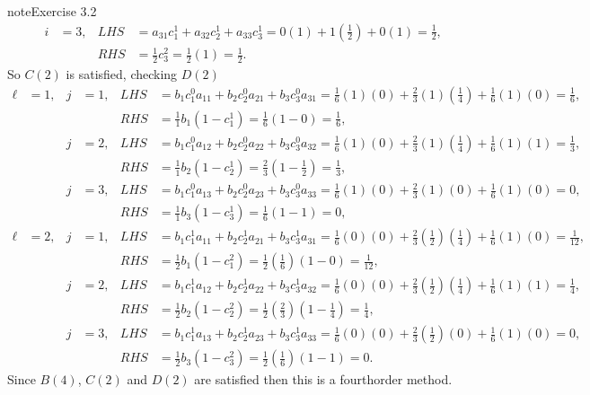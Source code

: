 \documentclass[letterpaper,10pt,english]{jupyterBook}
\begin{document}
\begin{sphinxadmonition}{note}{Exercise 3.2}
\begin{align*}
    && i &= 3, & LHS &= a_{31} c_1^1 + a_{32} c_2^1 + a_{33} c_3^1 = 0(1) + 1(\tfrac{1}{2}) + 0(1) = \tfrac{1}{2}, \\
    &&&& RHS &= \tfrac{1}{2} c_3^2 = \tfrac{1}{2}(1) = \tfrac{1}{2}.
\end{align*}
\sphinxAtStartPar
So \(C(2)\) is satisfied, checking \(D(2)\)
\begin{align*}
    \ell &= 1, & j &= 1, & LHS &= b_1 c_1^0 a_{11} + b_2 c_2^0 a_{21} + b_3 c_3^0 a_{31} 
    = \tfrac{1}{6}(1)(0) + \tfrac{2}{3}(1)(\tfrac{1}{4}) + \tfrac{1}{6}(1)(0) = \tfrac{1}{6}, \\
    &&&& RHS &= \tfrac{1}{1} b_1 (1 - c_1^1) = \tfrac{1}{6} (1 - 0) = \tfrac{1}{6}, \\
    && j &= 2, & LHS &= b_1 c_1^0 a_{12} + b_2 c_2^0 a_{22} + b_3 c_3^0 a_{32} 
    = \tfrac{1}{6}(1)(0) + \tfrac{2}{3}(1)(\tfrac{1}{4}) + \tfrac{1}{6}(1)(1) = \tfrac{1}{3}, \\
    &&&& RHS &= \tfrac{1}{1} b_2 (1 - c_2^1) = \tfrac{2}{3} (1 - \tfrac{1}{2}) = \tfrac{1}{3}, \\
    && j &= 3, & LHS &= b_1 c_1^0 a_{13} + b_2 c_2^0 a_{23} + b_3 c_3^0 a_{33} 
    = \tfrac{1}{6}(1)(0) + \tfrac{2}{3}(1)(0) + \tfrac{1}{6}(1)(0) = 0, \\
    &&&& RHS &= \tfrac{1}{1} b_3 (1 - c_3^1) = \tfrac{1}{6} (1 - 1) = 0, \\
    \ell &= 2, & j &= 1, & LHS &= b_1 c_1^1 a_{11} + b_2 c_2^1 a_{21} + b_3 c_3^1 a_{31} 
    = \tfrac{1}{6}(0)(0) + \tfrac{2}{3}(\tfrac{1}{2})(\tfrac{1}{4}) + \tfrac{1}{6}(1)(0) = \tfrac{1}{12}, \\
    &&&& RHS &= \tfrac{1}{2} b_1 (1 - c_1^2) = \tfrac{1}{2}(\tfrac{1}{6})(1 - 0) = \tfrac{1}{12}, \\
    && j &= 2, & LHS &= b_1 c_1^1 a_{12} + b_2 c_2^1 a_{22} + b_3 c_3^1 a_{32} 
    = \tfrac{1}{6}(0)(0) + \tfrac{2}{3}(\tfrac{1}{2})(\tfrac{1}{4}) + \tfrac{1}{6}(1)(1) = \tfrac{1}{4}, \\
    &&&& RHS &= \tfrac{1}{2} b_2 (1 - c_2^2) = \tfrac{1}{2} (\tfrac{2}{3})(1 - \tfrac{1}{4}) = \tfrac{1}{4}, \\
    && j &= 3, & LHS &= b_1 c_1^1 a_{13} + b_2 c_2^1 a_{23} + b_3 c_3^1 a_{33} 
    = \tfrac{1}{6}(0)(0) + \tfrac{2}{3}(\tfrac{1}{2})(0) + \tfrac{1}{6}(1)(0) = 0, \\
    &&&& RHS &= \tfrac{1}{2} b_3 (1 - c_3^2) = \tfrac{1}{2} (\tfrac{1}{6}) (1 - 1) = 0.
\end{align*}
\sphinxAtStartPar
Since \(B(4)\), \(C(2)\) and \(D(2)\) are satisfied then this is a fourth\sphinxhyphen{}order method.
\end{sphinxadmonition}
\end{document}

